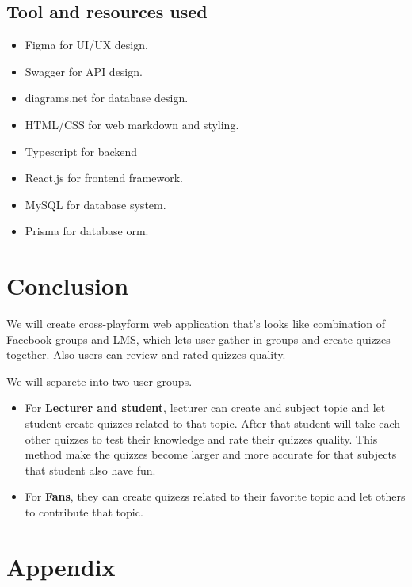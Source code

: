 \documentclass[a4paper, 12pt]{report}
\begin{document}
    \subsection*{Tool and resources used}
    \begin{itemize}
        \item Figma for UI/UX design.
        \item Swagger for API design.
        \item diagrams.net for database design.
        \item HTML/CSS for web markdown and styling.
        \item Typescript for backend
        \item React.js for frontend framework.
        \item MySQL for database system.
        \item Prisma for database orm.
    \end{itemize}


    \pagebreak
    \section*{Conclusion}

    We will create cross-playform web application that's looks like combination of Facebook groups and LMS, which lets user gather in groups and create quizzes together. Also users can review and rated quizzes quality.

    We will separete into two user groups.
    \begin{itemize}
        \item For \textbf{Lecturer and student}, lecturer can create and subject topic and let student create quizzes related to that topic. After that student will take each other quizzes to test their knowledge and rate their quizzes quality. This method make the quizzes become larger and more accurate for that subjects that student also have fun.
        \item For \textbf{Fans}, they can create quizezs related to their favorite topic and let others to contribute that topic.
    \end{itemize}

    \pagebreak
    \section*{Appendix}
\end{document}
